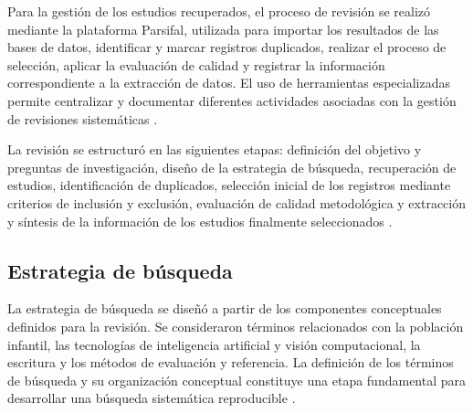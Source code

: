 \documentclass{iaesarticle}
\begin{document}
Para la gestión de los estudios recuperados, el proceso de revisión se realizó mediante la plataforma Parsifal, utilizada para importar los resultados de las bases de datos, identificar y marcar registros duplicados, realizar el proceso de selección, aplicar la evaluación de calidad y registrar la información correspondiente a la extracción de datos. El uso de herramientas especializadas permite centralizar y documentar diferentes actividades asociadas con la gestión de revisiones sistemáticas \cite{stefanovic2021}.

La revisión se estructuró en las siguientes etapas: definición del objetivo y preguntas de investigación, diseño de la estrategia de búsqueda, recuperación de estudios, identificación de duplicados, selección inicial de los registros mediante criterios de inclusión y exclusión, evaluación de calidad metodológica y extracción y síntesis de la información de los estudios finalmente seleccionados \cite{kitchenham2007}.

\subsection{Estrategia de búsqueda}

La estrategia de búsqueda se diseñó a partir de los componentes conceptuales definidos para la revisión. Se consideraron términos relacionados con la población infantil, las tecnologías de inteligencia artificial y visión computacional, la escritura y los métodos de evaluación y referencia. La definición de los términos de búsqueda y su organización conceptual constituye una etapa fundamental para desarrollar una búsqueda sistemática reproducible \cite{rethlefsen2021}.
\end{document}
